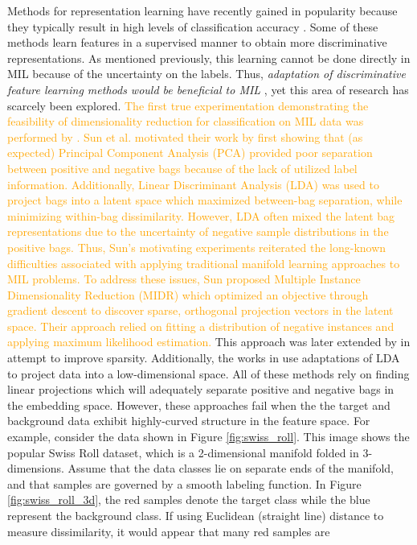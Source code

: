 Methods for representation learning have recently gained in popularity because they typically result in high levels of classification accuracy \citep{Bengio2014RepLearningReview}.  Some of these methods  learn features in a supervised manner to obtain more discriminative representations.  As mentioned previously, this learning cannot be done directly in  MIL because of the uncertainty on the labels.  Thus, \textit{adaptation of discriminative  feature learning methods would be beneficial to MIL} \citep{Carbonneau2016MILSurvey}, yet this area of research has scarcely been explored.  \textcolor{orange}{The first true experimentation demonstrating the feasibility of dimensionality reduction for classification on MIL data was performed by \citep{Sun2010MIDR}.  Sun et al. motivated their work by first showing that (as expected) Principal Component Analysis (PCA) provided poor separation between positive and negative bags because of the lack of utilized label information.  Additionally, Linear Discriminant Analysis (LDA) was used to project bags into a latent space which maximized between-bag separation, while minimizing within-bag dissimilarity.  However, LDA often mixed the latent bag representations due to the uncertainty of negative sample distributions in the positive bags.  Thus, Sun's motivating experiments  reiterated the long-known difficulties associated with applying traditional manifold learning approaches to MIL problems. To address these issues, Sun proposed Multiple Instance Dimensionality Reduction (MIDR) which optimized an objective through gradient descent to discover sparse, orthogonal projection vectors in the latent space.  Their approach relied on fitting a distribution of negative instances and applying maximum likelihood estimation. } This approach was later extended by \cite{Zhu2018MIDRSparsity} in attempt to improve sparsity.  Additionally, the works in \citep{Ping2010MILDRMaxMargin,Kim2010LocalDRMIL,Chai2014MIDA} use adaptations of LDA to project data into a low-dimensional space. All of these methods rely on finding linear projections which will adequately separate positive and negative bags in the embedding space.  However, these approaches fail when the the target and background data exhibit highly-curved structure in the feature space.  For example, consider the data shown in Figure \ref{fig:swiss_roll}.  This image shows the popular Swiss Roll dataset, which is a 2-dimensional manifold folded in 3-dimensions.  Assume that the data classes lie on separate ends of the manifold, and that samples are governed by a smooth labeling function.  In Figure \ref{fig:swiss_roll_3d}, the red samples denote the target class while the blue represent the background class.  If using Euclidean (straight line) distance to measure dissimilarity, it would appear that many red samples are 